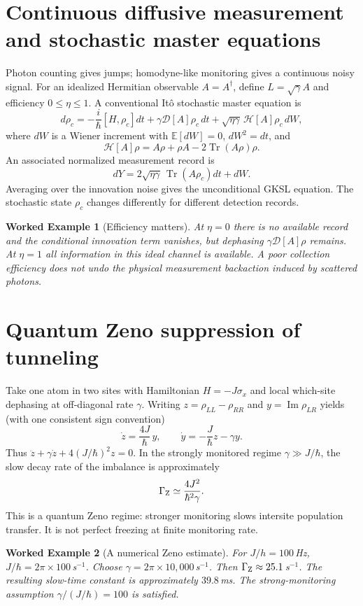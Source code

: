 \documentclass[11pt,a4paper]{article}
\newtheorem{example}{Worked Example}\newtheorem{remark}{Physical qualification}
\newcommand{\tr}{\operatorname{Tr}}\newcommand{\D}{\mathcal D}\newcommand{\kb}{k_{\mathrm B}}\newcommand{\E}{\mathbb E}\newcommand{\Ha}{\mathcal H}\newcommand{\ket}[1]{|#1\rangle}\newcommand{\bra}[1]{\langle#1|}
\begin{document}
\section{Continuous diffusive measurement and stochastic master equations}
Photon counting gives jumps; homodyne-like monitoring gives a continuous noisy signal. For an idealized Hermitian observable $A=A^\dagger$, define $L=\sqrt\gamma A$ and efficiency $0\le\eta\le1$. A conventional It\^o stochastic master equation is
\begin{equation}\label{eq:sme}
\boxed{d\rho_c=-\frac i\hbar[H,\rho_c]dt+\gamma\D[A]\rho_c\,dt+\sqrt{\eta\gamma}\,\mathcal H[A]\rho_c\,dW,}
\end{equation}
where $dW$ is a Wiener increment with $\E[dW]=0$, $dW^2=dt$, and
\begin{equation}
\mathcal H[A]\rho=A\rho+\rho A-2\tr(A\rho)\rho.
\end{equation}
An associated normalized measurement record is
\begin{equation}\label{eq:record}
dY=2\sqrt{\eta\gamma}\,\tr(A\rho_c)dt+dW.
\end{equation}
Averaging over the innovation noise gives the unconditional GKSL equation. The stochastic state $\rho_c$ changes differently for different detection records.
\begin{example}[Efficiency matters]
At $\eta=0$ there is no available record and the conditional innovation term vanishes, but dephasing $\gamma\D[A]\rho$ remains. At $\eta=1$ all information in this ideal channel is available. A poor collection efficiency does not undo the physical measurement backaction induced by scattered photons.
\end{example}
\section{Quantum Zeno suppression of tunneling}
Take one atom in two sites with Hamiltonian $H=-J\sigma_x$ and local which-site dephasing at off-diagonal rate $\gamma$. Writing $z=\rho_{LL}-\rho_{RR}$ and $y=\operatorname{Im}\rho_{LR}$ yields (with one consistent sign convention)
\begin{equation}
\dot z=\frac{4J}{\hbar}\,y,\qquad \dot y=-\frac J\hbar z-\gamma y.
\end{equation}
Thus $\ddot z+\gamma\dot z+4(J/\hbar)^2 z=0$. In the strongly monitored regime $\gamma\gg J/\hbar$, the slow decay rate of the imbalance is approximately
\begin{equation}\label{eq:zeno}
\Gamma_{\rm Z}\simeq\frac{4J^2}{\hbar^2\gamma}.
\end{equation}
This is a quantum Zeno regime: stronger monitoring slows intersite population transfer. It is not perfect freezing at finite monitoring rate.
\begin{example}[A numerical Zeno estimate]
For $J/h=100\,$Hz, $J/\hbar=2\pi\times100\,$s$^{-1}$. Choose $\gamma=2\pi\times10{,}000\,$s$^{-1}$. Then $\Gamma_{\rm Z}\approx25.1\,$s$^{-1}$. The resulting slow-time constant is approximately $39.8\,$ms. The strong-monitoring assumption $\gamma/(J/\hbar)=100$ is satisfied.
\end{example}
\end{document}
